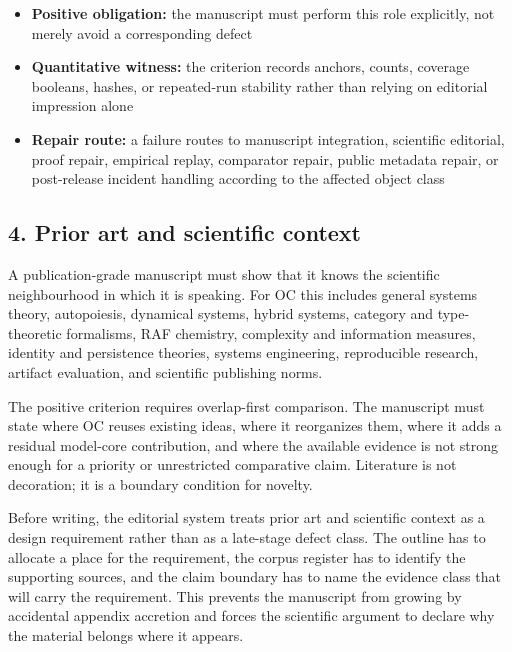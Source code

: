 \begin{itemize}[leftmargin=1.8em]

\item \textbf{Positive obligation:} the manuscript must perform this role explicitly, not merely avoid a corresponding defect

\item \textbf{Quantitative witness:} the criterion records anchors, counts, coverage booleans, hashes, or repeated-run stability rather than relying on editorial impression alone

\item \textbf{Repair route:} a failure routes to manuscript integration, scientific editorial, proof repair, empirical replay, comparator repair, public metadata repair, or post-release incident handling according to the affected object class

\end{itemize}

\subsection{4. Prior art and scientific context}

A publication-grade manuscript must show that it knows the scientific neighbourhood in which it is speaking. For OC this includes general systems theory, autopoiesis, dynamical systems, hybrid systems, category and type-theoretic formalisms, RAF chemistry, complexity and information measures, identity and persistence theories, systems engineering, reproducible research, artifact evaluation, and scientific publishing norms.


The positive criterion requires overlap-first comparison. The manuscript must state where OC reuses existing ideas, where it reorganizes them, where it adds a residual model-core contribution, and where the available evidence is not strong enough for a priority or unrestricted comparative claim. Literature is not decoration; it is a boundary condition for novelty.


Before writing, the editorial system treats prior art and scientific context as a design requirement rather than as a late-stage defect class. The outline has to allocate a place for the requirement, the corpus register has to identify the supporting sources, and the claim boundary has to name the evidence class that will carry the requirement. This prevents the manuscript from growing by accidental appendix accretion and forces the scientific argument to declare why the material belongs where it appears.


